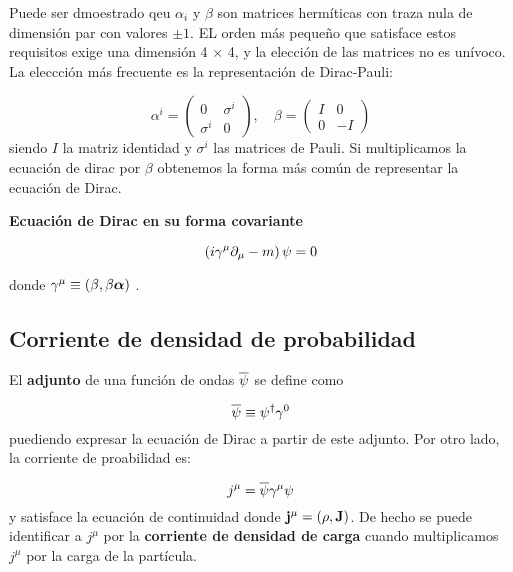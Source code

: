 Puede ser dmoestrado qeu $\alpha_i$ y $\beta$ son matrices hermíticas con traza nula de dimensión par con valores $\pm 1$. EL orden más pequeño que satisface estos requisitos exige una dimensión 4 $\times$ 4, y la elección de las matrices no es unívoco. La eleccción más frecuente es la representación de Dirac-Pauli:

\begin{equation}
    \alpha^i = \begin{pmatrix}
        0 & \sigma^i \\
        \sigma^i & 0
    \end{pmatrix} , \quad
    \beta = \begin{pmatrix}
        I & 0 \\
        0 & -I
    \end{pmatrix}
\end{equation}
siendo $I$ la matriz identidad y $\sigma^i$ las matrices de Pauli. Si multiplicamos la ecuación de dirac por $\beta$ obtenemos la forma más común de representar la ecuación de Dirac.

\begin{Resaltar}
    \begin{center}
        \textbf{Ecuación de Dirac en su forma covariante}
    \end{center}
    \begin{equation}
        \left( i \gamma^\mu \partial_\mu - m  \right) \psi = 0
    \end{equation}
\end{Resaltar}
donde $\gamma^\mu \equiv (\beta, \beta \boldsymbol{\alpha})$ .

\subsection{Corriente de densidad de probabilidad}


El \textbf{adjunto} de una función de ondas $\overline{\psi}$ se define como 

\begin{equation}
    \overline{\psi} \equiv \psi^\dagger \gamma^0
\end{equation}
puediendo expresar la ecuación de Dirac a partir de este adjunto. Por otro lado, la corriente de proabilidad es: 

\begin{equation}    
    j^\mu = \overline{\psi} \gamma^\mu \psi
\end{equation}
y satisface la ecuación de continuidad donde $\mathbf{j}^\mu=(\rho,\mathbf{J})$. De hecho se puede identificar a $j^\mu$ por la \textbf{corriente de densidad de carga} cuando multiplicamos $j^\mu$ por la carga de la partícula. 


